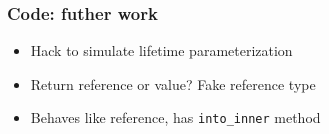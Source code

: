 \documentclass[xetex,mathserif,serif]{beamer}
\begin{document}
\begin{frame}
  \frametitle{Code: futher work}
  \begin{itemize}%
    \item Hack to simulate lifetime parameterization
    \item Return reference or value? Fake reference type
    \item Behaves like reference, has \texttt{into\_inner} method
  \end{itemize}
\end{frame}
\end{document}
